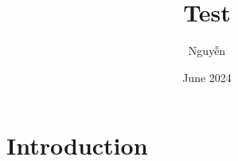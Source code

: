 \documentclass{article}
\title{Test}
\author{Nguyễn}
\date{June 2024}
\begin{document}
        
\maketitle
        
\section{Introduction}
        
\end{document}
